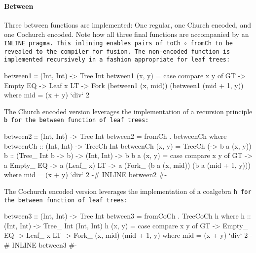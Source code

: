 \paragraph{Between} Three between functions are implemented:
One regular, one Church encoded, and one Cochurch encoded.
Note how all three final functions are accompanied by an \tt{INLINE} pragma. This inlining enables pairs of \tt{toCh $\circ$ fromCh} to be revealed to the compiler for fusion.
The non-encoded function is implemented recursively in a fashion appropriate for leaf trees:
\begin{code}
between1 :: (Int, Int) -> Tree Int
between1 (x, y) = case compare x y of
  GT -> Empty
  EQ -> Leaf x
  LT -> Fork (between1 (x, mid))
               (between1 (mid + 1, y))
  where mid = (x + y) `div` 2
\end{code}
The Church encoded version leverages the implementation of a recursion principle \tt{b} for the between function of leaf trees:
\begin{code}
between2 :: (Int, Int) -> Tree Int
between2 = fromCh . betweenCh
  where betweenCh :: (Int, Int) -> TreeCh Int
        betweenCh (x, y) = TreeCh (\a -> b a (x, y))
        b :: (Tree_ Int b -> b) -> (Int, Int) -> b
        b a (x, y) = case compare x y of
          GT -> a Empty_
          EQ -> a (Leaf_ x)
          LT -> a (Fork_ (b a (x, mid))
                         (b a (mid + 1, y)))
          where mid = (x + y) `div` 2
{-# INLINE between2 #-}
\end{code}
The Cochurch encoded version leverages the implementation of a coalgebra \tt{h} for the between function of leaf trees:
\begin{code}
between3 :: (Int, Int) -> Tree Int
between3 = fromCoCh . TreeCoCh h
  where h :: (Int, Int) -> Tree_ Int (Int, Int)
        h (x, y) = case compare x y of
          GT -> Empty_
          EQ -> Leaf_ x
          LT -> Fork_ (x, mid) (mid + 1, y)
          where mid = (x + y) `div` 2
{-# INLINE between3 #-}
\end{code}
